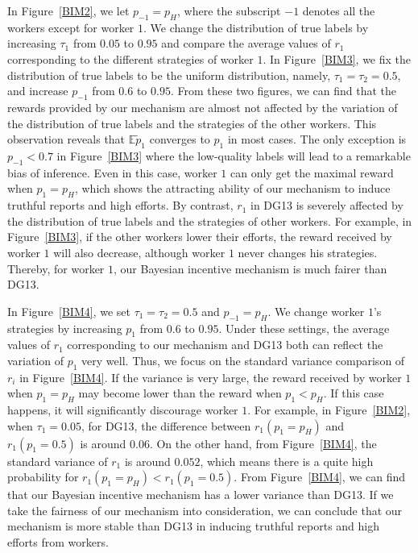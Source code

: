 \documentclass{article}
\begin{document}
In Figure~\ref{BIM2}, we let $p_{-1}=p_H$, where the subscript $-1$ denotes all the workers except for worker $1$.
We change the distribution of true labels by increasing $\tau_1$ from $0.05$ to $0.95$ and compare the average values of $r_1$ corresponding to the different strategies of worker $1$.
In Figure~\ref{BIM3}, we fix the distribution of true labels to be the uniform distribution, namely, $\tau_1=\tau_2=0.5$, and increase $p_{-1}$ from $0.6$ to $0.95$.
From these two figures, we can find that the rewards provided by our mechanism are almost not affected by the variation of the distribution of true labels and the strategies of the other workers.
This observation reveals that $\mathbb{E}\tilde{p}_1$ converges to $p_1$ in most cases.
The only exception is $p_{-1}<0.7$ in Figure~\ref{BIM3} where the low-quality labels will lead to a remarkable bias of inference.
Even in this case, worker $1$ can only get the maximal reward when $p_1=p_H$, which shows the attracting ability of our mechanism to induce truthful reports and high efforts.
By contrast, $r_1$ in DG13 is severely affected by the distribution of true labels and the strategies of other workers.
For example, in Figure~\ref{BIM3}, if the other workers lower their efforts, the reward received by worker $1$ will also decrease, although worker $1$ never changes his strategies.
Thereby, for worker $1$, our Bayesian incentive mechanism is much fairer than DG13.

In Figure~\ref{BIM4}, we set $\tau_1=\tau_2=0.5$ and $p_{-1}=p_H$. We change worker $1$'s strategies by increasing $p_1$ from $0.6$ to $0.95$. Under these settings, the average values of $r_1$ corresponding to our mechanism and DG13 both can reflect the variation of $p_1$ very well. Thus, we focus on the standard variance comparison of $r_i$ in Figure~\ref{BIM4}.
If the variance is very large, the reward received by worker $1$ when $p_1=p_H$ may become lower than the reward when $p_1<p_H$.
If this case happens, it will significantly discourage worker $1$.
For example, in Figure~\ref{BIM2}, when $\tau_1=0.05$, for DG13, the difference between $r_1(p_1=p_H)$ and $r_1(p_1=0.5)$ is around $0.06$.
On the other hand, from Figure~\ref{BIM4}, the standard variance of $r_1$ is around $0.052$, which means there is a quite high probability for $r_1(p_1=p_H)<r_1(p_1=0.5)$.
From Figure~\ref{BIM4}, we can find that our Bayesian incentive mechanism has a lower variance than DG13.
If we take the fairness of our mechanism into consideration, we can conclude that our mechanism is more stable than DG13 in inducing truthful reports and high efforts from workers.
\end{document}
